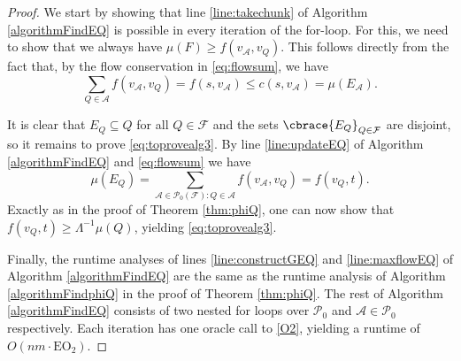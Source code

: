 \documentclass[a4paper, oneside,11pt]{amsart}
\theoremstyle{definition}
\theoremstyle{remark}
\numberwithin{equation}{section}
\newcommand{\mc}{\mathcal}
\DeclarePairedDelimiter\cbrace\{\}
\begin{document}
\begin{proof}
  We start by showing that line \ref{line:takechunk} of Algorithm \ref{algorithmFindEQ} is possible in every iteration of the for-loop. For this, we need to show that we always have $\mu(F) \geq f(v_{\mc{A}},v_Q)$. This follows directly from the fact that, by the flow conservation in \eqref{eq:flowsum}, we have
  $$
  \sum_{Q \in \mc{A}} f(v_{\mc{A}},v_Q) = f(s,v_{\mc{A}}) \leq c(s,v_{\mc{A}}) = \mu(E_{\mc{A}}).
  $$

  It is clear that  $E_Q \subseteq Q$ for all $Q \in \mc{F}$ and the sets $\cbrace{E_Q}_{Q \in \mc{F}}$ are disjoint, so it remains to prove \eqref{eq:toprovealg3}. By line \ref{line:updateEQ} of Algorithm \ref{algorithmFindEQ} and \eqref{eq:flowsum} we have
  $$
  \mu(E_Q) = \sum_{\mc{A} \in \mc{P}_0(\mc{F}):Q \in \mc{A}} f(v_{\mc{A}},v_Q) = f(v_Q,t).
  $$
  Exactly as in the proof of Theorem \ref{thm:phiQ}, one can now show that $f(v_Q,t) \geq \Lambda^{-1}\mu(Q)$, yielding \eqref{eq:toprovealg3}.

  Finally, the runtime analyses of lines  \ref{line:constructGEQ} and \ref{line:maxflowEQ} of Algorithm \ref{algorithmFindEQ} are the same as the runtime analysis of Algorithm \ref{algorithmFindphiQ} in the proof of Theorem \ref{thm:phiQ}. The rest of Algorithm \ref{algorithmFindEQ} consists of two nested for loops over $\mc{P}_0$ and $\mc{A}\in \mc{P}_0$ respectively. Each iteration has one oracle call to \ref{O2}, yielding a runtime of $O(nm\cdot \mathrm{EO}_2)$.
\end{proof}
\end{document}

